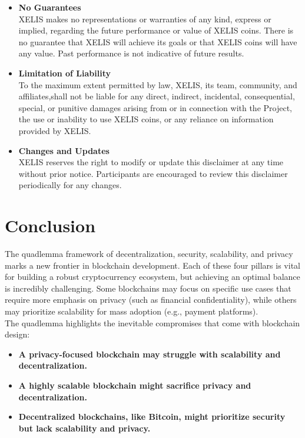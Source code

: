 \documentclass[10pt,a4paper,twocolumn]{article}
\begin{document}
\begin{itemize}
\item \textbf{No Guarantees}\\

XELIS makes no representations or warranties of any kind, express or implied, regarding the future performance or value of XELIS coins. There is no guarantee that XELIS will achieve its goals or that XELIS coins will have any value. Past performance is not indicative of future results.\\

\item \textbf{Limitation of Liability}\\

To the maximum extent permitted by law, XELIS, its team, community, and affiliates,shall not be liable for any direct, indirect, incidental, consequential, special, or punitive damages arising from or in connection with the Project, the use or inability to use XELIS coins, or any reliance on information provided by XELIS.\\

\item \textbf{Changes and Updates}\\

XELIS reserves the right to modify or update this disclaimer at any time without prior notice. Participants are encouraged to review this disclaimer periodically for any changes. 
\end{itemize}

 \section{Conclusion}
 
The quadlemma framework of decentralization, security, scalability, and privacy marks a new frontier in blockchain development. Each of these four pillars is vital for building a robust cryptocurrency ecosystem, but achieving an optimal balance is incredibly challenging. Some blockchains may focus on specific use cases that require more emphasis on privacy (such as financial confidentiality), while others may prioritize scalability for mass adoption (e.g., payment platforms).\\

The quadlemma highlights the inevitable compromises that come with blockchain design:

\begin{itemize}
    \item \textbf{A privacy-focused blockchain may struggle with scalability and decentralization.}
    \item \textbf{A highly scalable blockchain might sacrifice privacy and decentralization.}
    \item \textbf{Decentralized blockchains, like Bitcoin, might prioritize security but lack scalability and privacy.}
\end{itemize}
\end{document}
